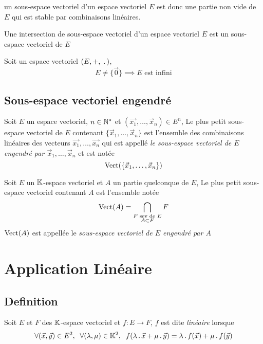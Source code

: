 \begin{rem}
un sous-espace vectoriel d'un espace vectoriel $E$ est donc une partie non vide
de $E$ qui est stable par combinaisons linéaires.
\end{rem}

\begin{prp}
Une intersection de sous-espace vectoriel d'un espace vectoriel $E$ est un
sous-espace vectoriel de $E$
\end{prp}

\begin{rem}
Soit un espace vectoriel $(E, +, \;\operatorname{.}\,)$,
\[
    E \neq \{\vec{0}\} \implies E \text{ est infini}
\]
\end{rem}


\subsection{Sous-espace vectoriel engendré}

\begin{prp}
Soit $E$ un espace vectoriel, $n \in \mathbb{N}^*$ et
$(\vec{x_1}, \ldots, \vec{x}_n) \in E^n$,
Le plus petit sous-espace vectoriel de $E$ contenant
$\{ \vec{x}_1, \ldots, \vec{x}_n \}$ est l'ensemble des combinaisons
linéaires des vecteurs $\vec{x_1}, \ldots, \vec{x_n}$ qui est appellé
\emph{le sous-espace vectoriel de $E$ engendré par
$\vec{x}_1, \ldots, \vec{x}_n$} et est notée
\[
    \operatorname{Vect}(\{\vec{x}_1, \ldots, \vec{x}_n\})
\]
\end{prp}

\begin{prp}
Soit $E$ un $\mathbb{K}$-espace vectoriel et $A$ un partie quelconque de $E$,
Le plus petit sous-espace vectoriel contenant $A$ est l'ensemble notée
\[
    \operatorname{Vect}(A) = \bigcap_{\substack{F \text{ sev de } E \\ A \subset F}} F
\]
$\operatorname{Vect}(A)$ est appellée le \emph{sous-espace vectoriel de $E$
engendré par $A$}
\end{prp}


\section{Application Linéaire}

\subsection{Definition}

\begin{dfn}
Soit $E$ et $F$ des $\mathbb{K}$-espace vectoriel et $f : E \to F$,
$f$ est dite \emph{linéaire} lorsque
\[
    \forall (\vec{x}, \vec{y}) \in E^2, \;\;
    \forall (\lambda, \mu) \in \mathbb{K}^2, \;\;
    f(\lambda \operatorname{.} \vec{x} + \mu \operatorname{.} \vec{y}) =
    \lambda \operatorname{.} f(\vec{x}) + \mu \operatorname{.} f(\vec{y})
\]
\end{dfn}

